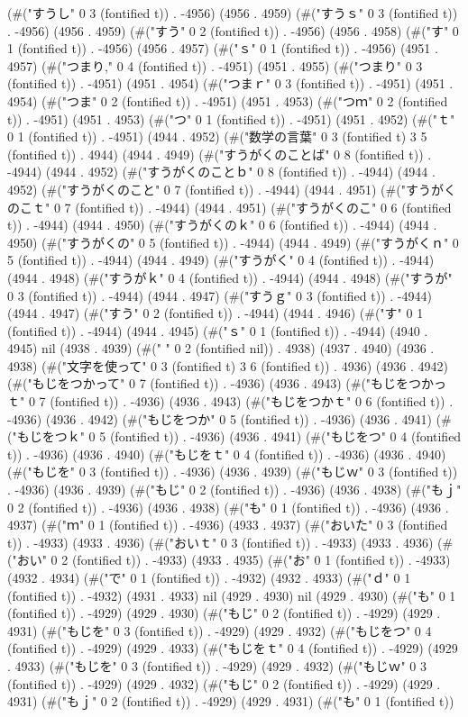 (#("すうし" 0 3 (fontified t)) . -4956) (4956 . 4959) (#("すうｓ" 0 3 (fontified t)) . -4956) (4956 . 4959) (#("すう" 0 2 (fontified t)) . -4956) (4956 . 4958) (#("す" 0 1 (fontified t)) . -4956) (4956 . 4957) (#("ｓ" 0 1 (fontified t)) . -4956) (4951 . 4957) (#("つまり," 0 4 (fontified t)) . -4951) (4951 . 4955) (#("つまり" 0 3 (fontified t)) . -4951) (4951 . 4954) (#("つまｒ" 0 3 (fontified t)) . -4951) (4951 . 4954) (#("つま" 0 2 (fontified t)) . -4951) (4951 . 4953) (#("つｍ" 0 2 (fontified t)) . -4951) (4951 . 4953) (#("つ" 0 1 (fontified t)) . -4951) (4951 . 4952) (#("ｔ" 0 1 (fontified t)) . -4951) (4944 . 4952) (#("数学の言葉" 0 3 (fontified t) 3 5 (fontified t)) . 4944) (4944 . 4949) (#("すうがくのことば" 0 8 (fontified t)) . -4944) (4944 . 4952) (#("すうがくのことｂ" 0 8 (fontified t)) . -4944) (4944 . 4952) (#("すうがくのこと" 0 7 (fontified t)) . -4944) (4944 . 4951) (#("すうがくのこｔ" 0 7 (fontified t)) . -4944) (4944 . 4951) (#("すうがくのこ" 0 6 (fontified t)) . -4944) (4944 . 4950) (#("すうがくのｋ" 0 6 (fontified t)) . -4944) (4944 . 4950) (#("すうがくの" 0 5 (fontified t)) . -4944) (4944 . 4949) (#("すうがくｎ" 0 5 (fontified t)) . -4944) (4944 . 4949) (#("すうがく" 0 4 (fontified t)) . -4944) (4944 . 4948) (#("すうがｋ" 0 4 (fontified t)) . -4944) (4944 . 4948) (#("すうが" 0 3 (fontified t)) . -4944) (4944 . 4947) (#("すうｇ" 0 3 (fontified t)) . -4944) (4944 . 4947) (#("すう" 0 2 (fontified t)) . -4944) (4944 . 4946) (#("す" 0 1 (fontified t)) . -4944) (4944 . 4945) (#("ｓ" 0 1 (fontified t)) . -4944) (4940 . 4945) nil (4938 . 4939) (#("  " 0 2 (fontified nil)) . 4938) (4937 . 4940) (4936 . 4938) (#("文字を使って" 0 3 (fontified t) 3 6 (fontified t)) . 4936) (4936 . 4942) (#("もじをつかって" 0 7 (fontified t)) . -4936) (4936 . 4943) (#("もじをつかっｔ" 0 7 (fontified t)) . -4936) (4936 . 4943) (#("もじをつかｔ" 0 6 (fontified t)) . -4936) (4936 . 4942) (#("もじをつか" 0 5 (fontified t)) . -4936) (4936 . 4941) (#("もじをつｋ" 0 5 (fontified t)) . -4936) (4936 . 4941) (#("もじをつ" 0 4 (fontified t)) . -4936) (4936 . 4940) (#("もじをｔ" 0 4 (fontified t)) . -4936) (4936 . 4940) (#("もじを" 0 3 (fontified t)) . -4936) (4936 . 4939) (#("もじｗ" 0 3 (fontified t)) . -4936) (4936 . 4939) (#("もじ" 0 2 (fontified t)) . -4936) (4936 . 4938) (#("もｊ" 0 2 (fontified t)) . -4936) (4936 . 4938) (#("も" 0 1 (fontified t)) . -4936) (4936 . 4937) (#("ｍ" 0 1 (fontified t)) . -4936) (4933 . 4937) (#("おいた" 0 3 (fontified t)) . -4933) (4933 . 4936) (#("おいｔ" 0 3 (fontified t)) . -4933) (4933 . 4936) (#("おい" 0 2 (fontified t)) . -4933) (4933 . 4935) (#("お" 0 1 (fontified t)) . -4933) (4932 . 4934) (#("で" 0 1 (fontified t)) . -4932) (4932 . 4933) (#("ｄ" 0 1 (fontified t)) . -4932) (4931 . 4933) nil (4929 . 4930) nil (4929 . 4930) (#("も" 0 1 (fontified t)) . -4929) (4929 . 4930) (#("もじ" 0 2 (fontified t)) . -4929) (4929 . 4931) (#("もじを" 0 3 (fontified t)) . -4929) (4929 . 4932) (#("もじをつ" 0 4 (fontified t)) . -4929) (4929 . 4933) (#("もじをｔ" 0 4 (fontified t)) . -4929) (4929 . 4933) (#("もじを" 0 3 (fontified t)) . -4929) (4929 . 4932) (#("もじｗ" 0 3 (fontified t)) . -4929) (4929 . 4932) (#("もじ" 0 2 (fontified t)) . -4929) (4929 . 4931) (#("もｊ" 0 2 (fontified t)) . -4929) (4929 . 4931) (#("も" 0 1 (fontified t)) 